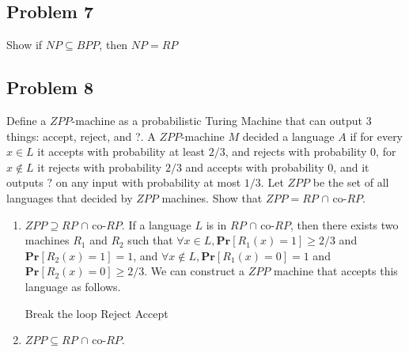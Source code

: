 \documentclass[english]{article}
\begin{document}
\subsection*{Problem 7}
Show if $NP \subseteq BPP$, then $NP = RP$

\subsection*{Problem 8}
Define a $ZPP$-machine as a probabilistic Turing Machine that can output 3 things: accept, reject, and ?.
A $ZPP$-machine $M$ decided a language $A$ if for every $x \in L$ it accepts with probability at least $2/3$, and
rejects with probability 0, for $x \notin L$ it rejects with probability $2/3$ and accepts with probability 0, and it
outputs $?$ on any input with probability at most $1/3$. Let $ZPP$ be the set of all languages that decided by
$ZPP$ machines. Show that $ZPP = RP$ $\cap$ co-$RP$.

\begin{enumerate}
  \item $ZPP \supseteq RP$ $\cap$ co-$RP$. 
    If a language $L$ is in $RP$ $\cap$ co-$RP$, then there exists two machines $R_1$ and $R_2$ such that
    $\forall x \in L, \mathbf{Pr}[R_1(x) = 1] \ge 2/3$ and $\mathbf{Pr}[R_2(x) = 1] = 1$,
    and $\forall x \notin L, \mathbf{Pr}[R_1(x) = 0] = 1$ and $\mathbf{Pr}[R_2(x) = 0] \ge 2/3$. We can construct
    a $ZPP$ machine that accepts this language as follows. 

    \begin{algorithmic} %
            \State Break the loop
          \EndIf
        \EndFor
          \State Reject
        \EndIf
      \EndFor
      \State Accept
    \EndFunction 
    \end{algorithmic}

  \item $ZPP \subseteq RP$ $\cap$ co-$RP$. 
\end{enumerate}
\end{document}
